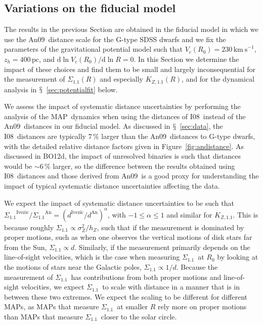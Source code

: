 \documentclass{emulateapj}
\newcommand{\dd}{\mathrm{d}}
\renewcommand{\figurename}{Figure}
\newcommand{\sectionname}{$\mathsection$}
\newcommand{\map}{MAP}
\newcommand{\pc}{\ensuremath{\,\mathrm{pc}}}
\newcommand{\kms}{\ensuremath{\,\mathrm{km\ s}^{-1}}}
\newcommand{\sigoneone}{\ensuremath{\Sigma_{1.1}}}
\newcommand{\kzoneone}{\ensuremath{K_{Z,1.1}}}
\newcommand{\bo}{BO12}
\newcommand{\iv}{I08}
\newcommand{\an}{An09}
\begin{document}
\subsection{Variations on the fiducial model}\label{sec:systematics}

The results in the previous Section are obtained in the fiducial model
in which we use the \an\ distance scale for the G-type SDSS dwarfs and
we fix the parameters of the gravitational potential model such that
$V_c(R_0) = 230\kms$, $z_h = 400\pc$, and $\dd \ln V_c(R_0) / \dd \ln
R = 0$. In this Section we determine the impact of these choices and
find them to be small and largely inconsequential for the measurement
of $\sigoneone(R)$ and especially $\kzoneone(R)$, and for the
dynamical analysis in \sectionname~\ref{sec:potentialfit} below.

We assess the impact of systematic distance uncertainties by
performing the analysis of the \map\ dynamics when using the distances
of \iv\ instead of the \an\ distances in our
fiducial model. As discussed in \sectionname~\ref{sec:data}, the
\iv\ distances are typically $7\,\%$ larger than the
\an\ distances to G-type dwarfs, with the detailed relative
distance factors given in \figurename~\ref{fig:andistance}. As
discussed in \bo d, the impact of unresolved binaries is such that
distances would be $\sim\!6\,\%$ larger, so the difference between the
results obtained using \iv\ distances and those derived
from \an\ is a good proxy for understanding the impact of
typical systematic distance uncertainties affecting the data.

We expect the impact of systematic distance uncertainties to be such
that $\sigoneone^{\mathrm{Ivezic}} / \sigoneone^{\mathrm{An}} =
(d^\mathrm{Ivezic} / d^{\mathrm{An}})^\alpha$, with $-1 \leq \alpha
\leq 1$ and similar for \kzoneone. This is because roughly $\sigoneone
\propto \sigma_Z^2 / h_Z$, such that if the measurement is dominated
by proper motions, such as when one observes the vertical motions of
disk stars far from the Sun, $\sigoneone \propto d$. Similarly, if the
measurement primarily depends on the line-of-sight velocities, which
is the case when measuring \sigoneone\ at $R_0$ by looking at the
motions of stars near the Galactic poles, $\sigoneone \propto
1/d$. Because the measurement of \sigoneone\ has contributions from
both proper motions and line-of-sight velocities, we expect
\sigoneone\ to scale with distance in a manner that is in between
these two extremes. We expect the scaling to be different for
different \map s, as \map s that measure \sigoneone\ at smaller $R$
rely more on proper motions than \map s that measure
\sigoneone\ closer to the solar circle.
\end{document}
